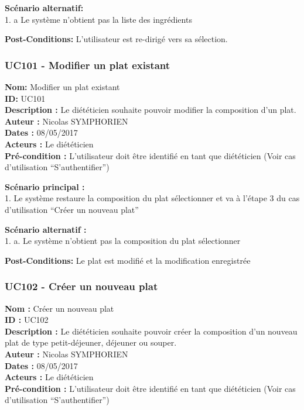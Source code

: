 \textbf{Scénario alternatif:}\\
1. a Le système n'obtient pas la liste des ingrédients

\textbf{Post-Conditions:} L'utilisateur est re-dirigé vers sa sélection.

\subsubsection{UC101 - Modifier un plat
existant}\label{uc101---modifier-un-plat-existant}

\noindent\textbf{Nom:} Modifier un plat existant\\
\textbf{ID:} UC101\\
\textbf{Description :} Le diététicien souhaite pouvoir modifier la
composition d'un plat.\\
\textbf{Auteur :} Nicolas SYMPHORIEN\\
\textbf{Dates :} 08/05/2017\\
\textbf{Acteurs :} Le diététicien\\
\textbf{Pré-condition :} L'utilisateur doit être identifié en tant que
diététicien (Voir cas d'utilisation ``S'authentifier'')

\textbf{Scénario principal :}\\
1. Le système restaure la composition du plat sélectionner et va à
l'étape 3 du cas d'utilisation ``Créer un nouveau plat''

\textbf{Scénario alternatif :}\\
1. a. Le système n'obtient pas la composition du plat sélectionner

\textbf{Post-Conditions:} Le plat est modifié et la modification
enregistrée

\subsubsection{UC102 - Créer un nouveau
plat}\label{uc102---cruxe9er-un-nouveau-plat}

\noindent\textbf{Nom :} Créer un nouveau plat\\
\textbf{ID :} UC102\\
\textbf{Description :} Le diététicien souhaite pouvoir créer la
composition d'un nouveau plat de type petit-déjeuner, déjeuner ou
souper.\\
\textbf{Auteur :} Nicolas SYMPHORIEN\\
\textbf{Dates :} 08/05/2017\\
\textbf{Acteurs :} Le diététicien\\
\textbf{Pré-condition :} L'utilisateur doit être identifié en tant que
diététicien (Voir cas d'utilisation ``S'authentifier'')

